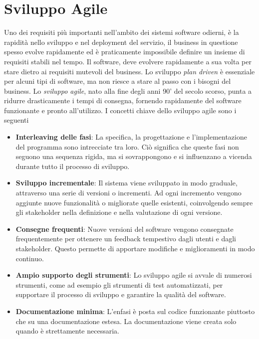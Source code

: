 \documentclass[10pt, letterpaper]{report}
\begin{document}
\chapter{Sviluppo Agile}
Uno dei requisiti più importanti nell'ambito dei sistemi software odierni, è la rapidità nello sviluppo e nel deployment del servizio, il business in questione spesso evolve rapidamente ed è praticamente impossibile definire un insieme di requisiti stabili nel tempo. Il software, deve evolvere rapidamente a sua volta per stare dietro ai requisiti mutevoli del business.\acc 
   Lo sviluppo \textit{plan driven} è essenziale per alcuni tipi di software, ma non riesce a stare al passo con i bisogni del business. 
    Lo \textit{sviluppo agile}, nato alla fine degli anni 90' del secolo scorso, punta a ridurre drasticamente i tempi di consegna, fornendo rapidamente del software funzionante e pronto all'utilizzo.
\acc I concetti chiave dello sviluppo agile sono i seguenti\begin{itemize}
    \item \textbf{Interleaving delle fasi}: La specifica, la progettazione e l'implementazione del programma sono intrecciate tra loro. Ciò significa che queste fasi non seguono una sequenza rigida, ma si sovrappongono e si influenzano a vicenda durante tutto il processo di sviluppo.
    \item \textbf{Sviluppo incrementale}: Il sistema viene sviluppato in modo graduale, attraverso una serie di versioni o incrementi. Ad ogni incremento vengono aggiunte nuove funzionalità o migliorate quelle esistenti, coinvolgendo sempre gli stakeholder nella definizione e nella valutazione di ogni versione.
    \item \textbf{Consegne frequenti}: Nuove versioni del software vengono consegnate frequentemente per ottenere un feedback tempestivo dagli utenti e dagli stakeholder. Questo permette di apportare modifiche e miglioramenti in modo continuo.
    \item \textbf{Ampio supporto degli strumenti}: Lo sviluppo agile si avvale di numerosi strumenti, come ad esempio gli strumenti di test automatizzati, per supportare il processo di sviluppo e garantire la qualità del software.
    \item \textbf{Documentazione minima}: L'enfasi è posta sul codice funzionante piuttosto che su una documentazione estesa. La documentazione viene creata solo quando è strettamente necessaria.
\end{itemize}
\end{document}

